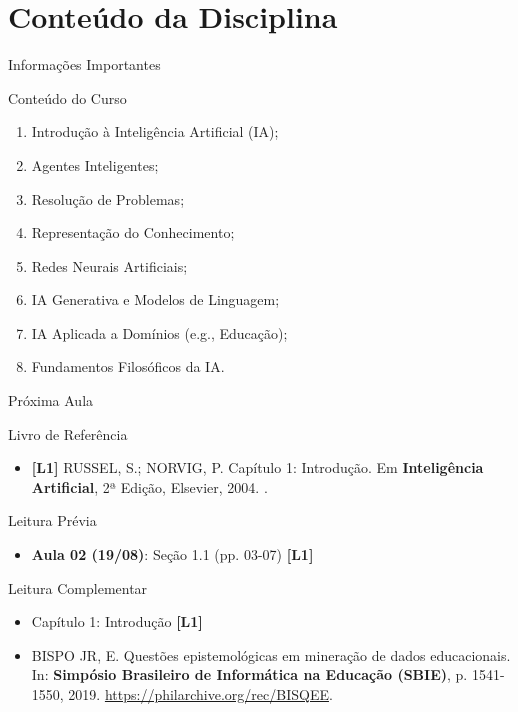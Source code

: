 \documentclass[xcolor=dvipsnames,table]{beamer}
\begin{document}

\section{Conteúdo da Disciplina}
	
	\begin{frame}{Informações Importantes}
		\begin{block}{Conteúdo do Curso}
			\begin{enumerate}
				\item Introdução à Inteligência Artificial (IA);
				\item Agentes Inteligentes;
				\item Resolução de Problemas;
				\item Representação do Conhecimento;
				\item Redes Neurais Artificiais;
				\item IA Generativa e Modelos de Linguagem;
				\item IA Aplicada a Domínios (e.g., Educação);
				\item Fundamentos Filosóficos da IA.
			\end{enumerate}
		\end{block}
	\end{frame}

    \begin{frame}{Próxima Aula}
    \begin{block}{Livro de Referência}
        \begin{itemize}
            \item {\bf \color{blue} [L1]} RUSSEL, S.; NORVIG, P. Capítulo 1: Introdução. Em {\bf Inteligência Artificial}, 2ª Edição, Elsevier, 2004. \color{blue}{\bf Código Bib.: [004.89 RUS /int]}.
        \end{itemize}
    \end{block}
    \begin{block}{Leitura Prévia}
        \begin{itemize}
        \item {\bf Aula 02 (19/08)}: Seção 1.1 (pp. 03-07) {\bf \color{blue} [L1]} 
        \end{itemize}
    \end{block}
    \begin{block}{Leitura Complementar}
        \begin{itemize}
        \item Capítulo 1: Introdução {\bf \color{blue} [L1]} 
        \item BISPO JR, E. Questões epistemológicas em mineração de dados educacionais. In: {\bf Simpósio Brasileiro de Informática na Educação (SBIE)},  p. 1541-1550, 2019. \url{https://philarchive.org/rec/BISQEE}.
        \end{itemize}
    \end{block}
\end{frame}
	
	\begin{frame}
		\titlepage
	\end{frame}
	
\end{document}
